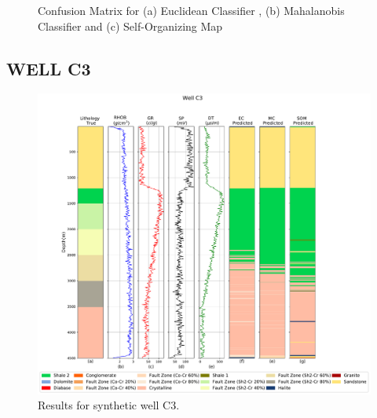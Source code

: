 \documentclass[preprint,12pt]{elsarticle}
\begin{document}
\begin{figure}[ht!]
\begin{center}
		\caption{ Confusion Matrix for (a) Euclidean Classifier , (b) Mahalanobis Classifier and (c) Self-Organizing Map}
		\label{fig:CM_C2}
	\end{center}
\end{figure}

\subsection{WELL C3}
\label{subsub:C3}


\begin{figure}[!htb]
	\centering
	\includegraphics[scale=0.4]{imagens/wellC3nx80v02.pdf}
	\caption{Results for synthetic well C3.  }
	\label{fig:well_C3}
\end{figure}
\end{document}
